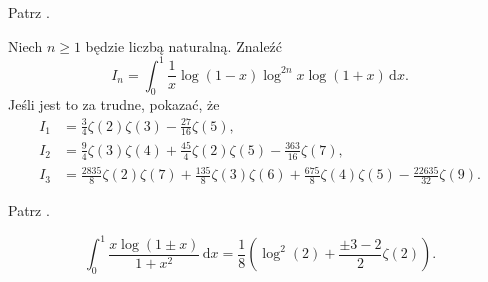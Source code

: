 
\begin{solution}
    Patrz \cite[s. 4, 5]{valean19}.
\end{solution}


\begin{problem_with_solution}
    \label{valean_1_10}%
    Niech $n \ge 1$ będzie liczbą naturalną.
    Znaleźć
    \begin{equation}
        I_n = \int_0^1 \frac 1 x \log(1-x) \log^{2n} x \log (1+x) \,\mathrm{d}x.
    \end{equation}
    Jeśli jest to za trudne, pokazać, że
    \begin{align}
        I_1 & = \frac 3 4 \zeta (2) \zeta (3) - \frac {27}{16} \zeta(5), \\
        I_2 & = \frac 9 4 \zeta (3) \zeta (4) + \frac{45}{4} \zeta(2) \zeta(5) - \frac{363}{16} \zeta (7), \\
        I_3 & = \frac{2835}{8} \zeta(2) \zeta (7) + \frac {135}{8} \zeta (3) \zeta (6) + \frac {675}{8} \zeta (4) \zeta (5) - \frac {22635}{32} \zeta (9).
    \end{align} 
\end{problem_with_solution}


\begin{solution}
    Patrz \cite[s. 6, 7]{valean19}.
\end{solution}

\begin{problem_with_solution}
    \label{valean_1_13}%
    \begin{equation}
        \int_0^1 \frac{x \log (1 \pm x)}{1 + x^2} \, \mathrm{d} x = \frac 1 8 \left(\log^2 (2) + \frac{\pm 3 - 2}{2} \zeta(2)\right).
    \end{equation} 
\end{problem_with_solution}


